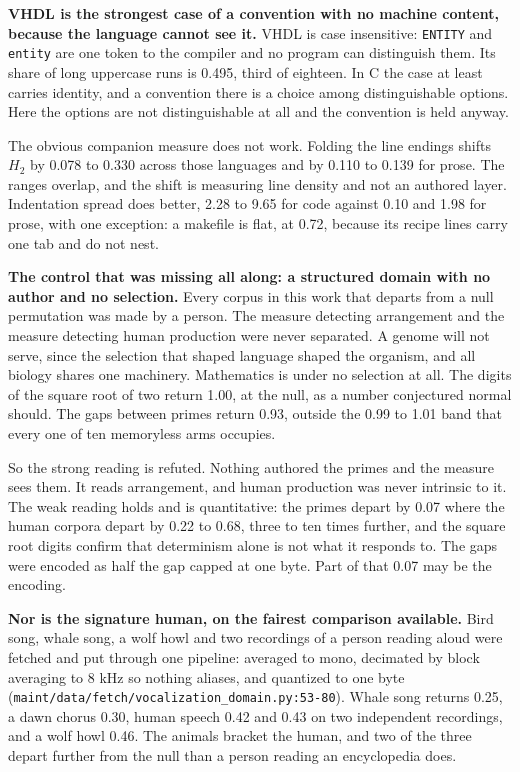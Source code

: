 \textbf{VHDL is the strongest case of a convention with no machine content, because the language cannot see it.} VHDL is case insensitive: \texttt{ENTITY} and \texttt{entity} are one token to the compiler and no program can distinguish them. Its share of long uppercase runs is 0.495, third of eighteen. In C the case at least carries identity, and a convention there is a choice among distinguishable options. Here the options are not distinguishable at all and the convention is held anyway.

The obvious companion measure does not work. Folding the line endings shifts \(H_2\) by 0.078 to 0.330 across those languages and by 0.110 to 0.139 for prose. The ranges overlap, and the shift is measuring line density and not an authored layer. Indentation spread does better, 2.28 to 9.65 for code against 0.10 and 1.98 for prose, with one exception: a makefile is flat, at 0.72, because its recipe lines carry one tab and do not nest.

\textbf{The control that was missing all along: a structured domain with no author and no selection.} Every corpus in this work that departs from a null permutation was made by a person. The measure detecting arrangement and the measure detecting human production were never separated. A genome will not serve, since the selection that shaped language shaped the organism, and all biology shares one machinery. Mathematics is under no selection at all. The digits of the square root of two return 1.00, at the null, as a number conjectured normal should. The gaps between primes return 0.93, outside the 0.99 to 1.01 band that every one of ten memoryless arms occupies.

So the strong reading is refuted. Nothing authored the primes and the measure sees them. It reads arrangement, and human production was never intrinsic to it. The weak reading holds and is quantitative: the primes depart by 0.07 where the human corpora depart by 0.22 to 0.68, three to ten times further, and the square root digits confirm that determinism alone is not what it responds to. The gaps were encoded as half the gap capped at one byte. Part of that 0.07 may be the encoding.

\textbf{Nor is the signature human, on the fairest comparison available.} Bird song, whale song, a wolf howl and two recordings of a person reading aloud were fetched and put through one pipeline: averaged to mono, decimated by block averaging to 8 kHz so nothing aliases, and quantized to one byte (\texttt{maint/\allowbreak{}data/\allowbreak{}fetch/\allowbreak{}vocalization\_\allowbreak{}domain.\allowbreak{}py:53-\allowbreak{}80}). Whale song returns 0.25, a dawn chorus 0.30, human speech 0.42 and 0.43 on two independent recordings, and a wolf howl 0.46. The animals bracket the human, and two of the three depart further from the null than a person reading an encyclopedia does.

